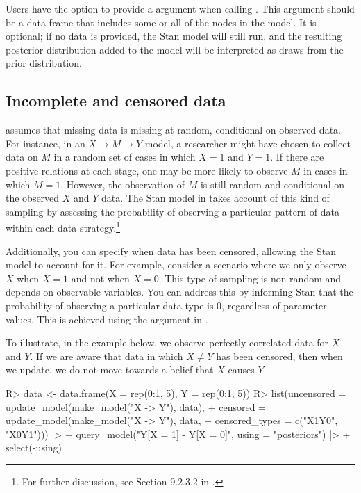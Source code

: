 \documentclass[
  11pt,
  article]{jss}
\renewcommand{\texttt}[1]{\code{#1}}
\begin{document}
Users have the option to provide a \texttt{data} argument when calling
\texttt{update\_model()}. This argument should be a data frame that
includes some or all of the nodes in the model. It is optional; if no
data is provided, the Stan model will still run, and the resulting
posterior distribution added to the model will be interpreted as draws
from the prior distribution.

\subsection{Incomplete and censored
data}\label{incomplete-and-censored-data}

 assumes that missing data is missing at random,
conditional on observed data. For instance, in an
\(X \rightarrow M \rightarrow Y\) model, a researcher might have chosen
to collect data on \(M\) in a random set of cases in which \(X=1\) and
\(Y=1\). If there are positive relations at each stage, one may be more
likely to observe \(M\) in cases in which \(M=1\). However, the
observation of \(M\) is still random and conditional on the observed
\(X\) and \(Y\) data. The Stan model in  takes
account of this kind of sampling by assessing the probability of
observing a particular pattern of data within each data
strategy.\footnote{For further discussion, see Section 9.2.3.2 in
  \citet{humphreys_integrated_2023}.}

Additionally, you can specify when data has been censored, allowing the
Stan model to account for it. For example, consider a scenario where we
only observe \(X\) when \(X=1\) and not when \(X=0\). This type of
sampling is non-random and depends on observable variables. You can
address this by informing Stan that the probability of observing a
particular data type is \(0\), regardless of parameter values. This is
achieved using the \texttt{censored\_types} argument in
\texttt{update\_model()}.

To illustrate, in the example below, we observe perfectly correlated
data for \(X\) and \(Y\). If we are aware that data in which
\(X \neq Y\) has been censored, then when we update, we do not move
towards a belief that \(X\) causes \(Y\).

\begin{CodeInput}
R> data <- data.frame(X = rep(0:1, 5), Y = rep(0:1, 5))
R> list(uncensored = update_model(make_model("X -> Y"), data),
+    censored = update_model(make_model("X -> Y"), data, 
+    censored_types = c("X1Y0",  "X0Y1"))) |>
+    query_model("Y[X = 1] - Y[X = 0]", using = "posteriors") |>
+    select(-using)
\end{CodeInput}
\end{document}
